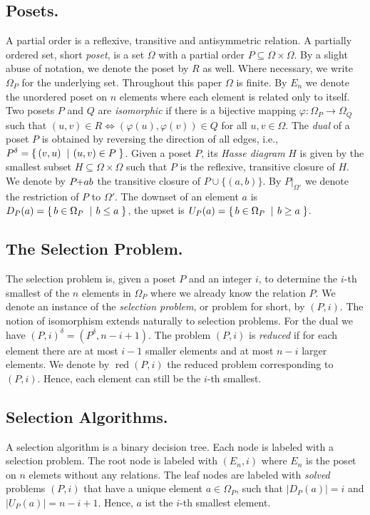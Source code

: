 \documentclass[twoside,leqno,twocolumn]{article}
\makeatletter
\newcommand{\set}[2]{\left\{\, \mathinner{#1}\vphantom{#2}\: \left|\: \vphantom{#1}\mathinner{#2} \right.\,\right\}}
\newcommand\ie{i.e\@., }
\newcommand{\sse}{\subseteq}
\newcommand{\pchild}[3]{{#1}\kern-1pt{+}{#2}{#3}}
\newcommand{\dual}[1]{{#1}^{\delta}}
\newcommand{\reduced}[1]{\operatorname{red}{#1}}
\newcommand{\less}[2]{D_{#1}(#2)}
\newcommand{\greater}[2]{U_{#1}(#2)}
\makeatother
\begin{document}
\subsection{Posets.}
A partial order is a reflexive, transitive and antisymmetric relation.
A partially ordered set, short \emph{poset}, is a set $\Omega$ with a partial order $P \subseteq \Omega \times \Omega$.
By a slight abuse of notation, we denote the poset by $R$ as well.
Where necessary, we write $\Omega_P$ for the underlying set.
Throughout this paper $\Omega$ is finite.
By $E_n$ we denote the unordered poset on $n$ elements where each element is related only to itself.
Two posets $P$ and $Q$ are \emph{isomorphic} if there is a bijective mapping $\varphi: \Omega_P \to \Omega_Q$ such that $(u, v) \in R \iff (\varphi(u), \varphi(v)) \in Q$ for all $u, v \in \Omega$.
The \emph{dual} of a poset $P$ is obtained by reversing the direction of all edges, \ie $\dual{P} = \set{(v,u)}{(u,v) \in P}$.
Given a poset $P$, its \emph{Hasse diagram} $H$ is given by the smallest subset $H \sse \Omega \times \Omega$ such that $P$ is the reflexive, transitive closure of $H$.
We denote by $\pchild{P}{a}{b}$ the transitive closure of $P \cup \{(a, b)\}$.
By $P|_{\Omega'}$ we denote the restriction of $P$ to $\Omega'$.
The downset of an element $a$ is $\less{P}{a} = \set{b \in \Omega_P}{b \le a}$, the upset is $\greater{P}{a} = \set{b \in \Omega_P}{b \ge a}$.

\subsection{The Selection Problem.}
The selection problem is, given a poset $P$ and an integer $i$, to determine the $i$-th smallest of the $n$ elements in $\Omega_P$ where we already know the relation $P$.
We denote an instance of the \emph{selection problem}, or problem for short, by $(P, i)$.
The notion of isomorphism extends naturally to selection problems.
For the dual we have $\dual{(P, i)} = (\dual{P}, n - i + 1)$.
The problem $(P, i)$ is \emph{reduced} if for each element there are at most $i - 1$ smaller elements and at most $n - i$ larger elements.
We denote by $\reduced{(P, i)}$ the reduced problem corresponding to $(P, i)$.
Hence, each element can still be the $i$-th smallest.

\subsection{Selection Algorithms.}
A selection algorithm is a binary decision tree.
Each node is labeled with a selection problem.
The root node is labeled with $(E_n, i)$ where $E_n$ is the poset on $n$ elemets without any relations.
The leaf nodes are labeled with \emph{solved} problems $(P, i)$ that have a unique element $a \in \Omega_P$, such that $|\less{P}{a}| = i$ and $|\greater{P}{a}| = n - i + 1$.
Hence, $a$ ist the $i$-th smallest element.
\end{document}
